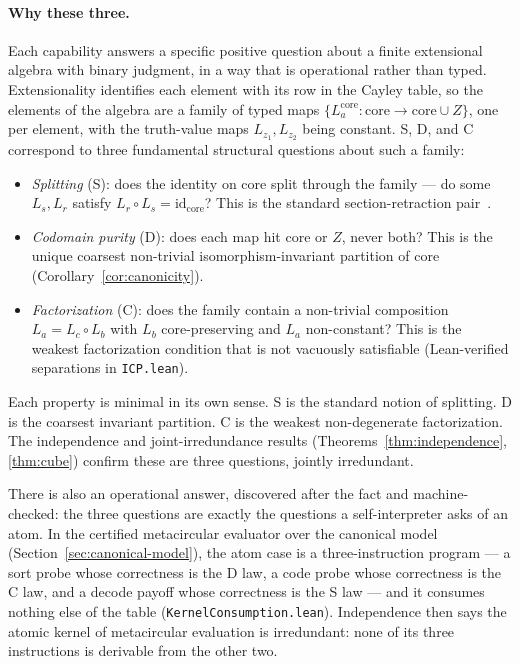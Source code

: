 \documentclass[sigconf,screen]{acmart}
\newcommand{\core}{\mathrm{core}}
\theoremstyle{remark}
\begin{document}
\paragraph{Why these three.} Each capability answers a specific positive
question about a finite extensional algebra with binary judgment, in a
way that is operational rather than typed. Extensionality identifies
each element with its row in the Cayley table, so the elements of the
algebra are a family of typed maps
$\{L_a^{\core} : \core \to \core \cup Z\}$, one per element, with the
truth-value maps $L_{z_1}, L_{z_2}$ being constant. S, D, and C
correspond to three fundamental structural questions about such a
family:
\begin{itemize}
  \item \emph{Splitting} (S): does the identity on core split through
    the family --- do some $L_s, L_r$ satisfy
    $L_r \circ L_s = \mathrm{id}_{\core}$? This is the standard
    section-retraction pair~\cite{maclane71}.
  \item \emph{Codomain purity} (D): does each map hit $\core$ or $Z$,
    never both? This is the unique coarsest non-trivial
    isomorphism-invariant partition of core
    (Corollary~\ref{cor:canonicity}).
  \item \emph{Factorization} (C): does the family contain a non-trivial
    composition $L_a = L_c \circ L_b$ with $L_b$ core-preserving and
    $L_a$ non-constant? This is the weakest factorization condition
    that is not vacuously satisfiable (Lean-verified separations in
    \texttt{ICP.lean}).
\end{itemize}
Each property is minimal in its own sense. S is the standard notion of
splitting. D is the coarsest invariant partition. C is the weakest
non-degenerate factorization. The independence and joint-irredundance
results (Theorems~\ref{thm:independence}, \ref{thm:cube}) confirm these
are three questions, jointly irredundant.

There is also an operational answer, discovered after the fact and
machine-checked: the three questions are exactly the questions a
self-interpreter asks of an atom. In the certified metacircular
evaluator over the canonical model (Section~\ref{sec:canonical-model}),
the atom case is a three-instruction program --- a sort probe whose
correctness is the D law, a code probe whose correctness is the C law,
and a decode payoff whose correctness is the S law --- and it consumes
nothing else of the table (\texttt{KernelConsumption.lean}).
Independence then says the atomic kernel of metacircular evaluation is
irredundant: none of its three instructions is derivable from the other
two.
\end{document}
